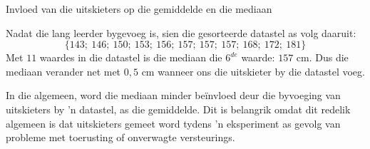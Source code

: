 \begin{wex}{Invloed van die uitskieters op die gemiddelde en die mediaan}
{  

  Nadat die lang leerder bygevoeg is, sien die gesorteerde datastel as volg daaruit:
  \begin{equation*}
    \{143;\ 146;\ 150;\ 153;\ 156;\ 157;\ 157;\ 157;\ 168;\ 172;\ 181\}
  \end{equation*}
  Met $11$ waardes in die datastel is die mediaan die $6^{de}$ waarde: $157$ cm.
  Dus die mediaan verander net met $0,5$ cm wanneer ons die uitskieter by die datastel voeg.

 In die algemeen, word die mediaan minder beïnvloed deur die byvoeging van uitskieters by ’n datastel, as die gemiddelde. Dit is belangrik omdat dit redelik algemeen is dat uitskieters gemeet word tydens ’n eksperiment as gevolg van probleme met toerusting of onverwagte versteurings.
}
\end{wex}

